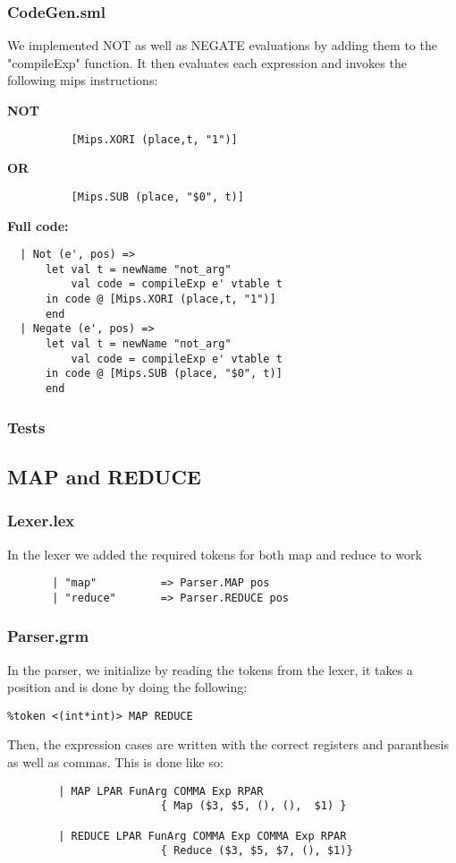 \documentclass[12pt]{article}
\begin{document}
\subsubsection{CodeGen.sml}
We implemented NOT as well as NEGATE evaluations by adding them to the "compileExp" function. It then evaluates each expression and invokes the following mips instructions:

\textbf{NOT}
\begin{verbatim}
          [Mips.XORI (place,t, "1")]
\end{verbatim}

\textbf{OR}
\begin{verbatim}
          [Mips.SUB (place, "$0", t)]
\end{verbatim}
\clearpage
\textbf{Full code:}
\begin{verbatim}
  | Not (e', pos) =>
      let val t = newName "not_arg"
          val code = compileExp e' vtable t
      in code @ [Mips.XORI (place,t, "1")]
      end
  | Negate (e', pos) =>
      let val t = newName "not_arg"
          val code = compileExp e' vtable t
      in code @ [Mips.SUB (place, "$0", t)]
      end
\end{verbatim}
\subsubsection{Tests}
\subsection{MAP and REDUCE}
\subsubsection{Lexer.lex}
In the lexer we added the required tokens for both map and reduce to work
\begin{verbatim}
       | "map"          => Parser.MAP pos
       | "reduce"       => Parser.REDUCE pos
\end{verbatim}
\subsubsection{Parser.grm}
In the parser, we initialize by reading the tokens from the lexer, it takes a position and is done by doing the following:
\begin{verbatim}
%token <(int*int)> MAP REDUCE
\end{verbatim}

Then, the expression cases are written with the correct registers and paranthesis as well as commas. This is done like so:
\begin{verbatim}
        | MAP LPAR FunArg COMMA Exp RPAR
                        { Map ($3, $5, (), (),  $1) }

        | REDUCE LPAR FunArg COMMA Exp COMMA Exp RPAR
                        { Reduce ($3, $5, $7, (), $1)}
\end{verbatim}
\end{document}
